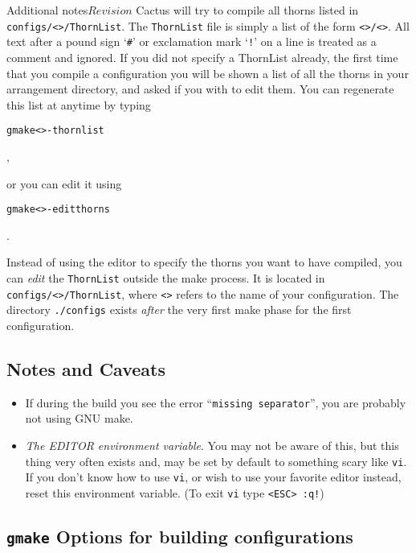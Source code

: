 \begin{cactuspart}{Additional notes}{}{$Revision$}
Cactus will try to compile all thorns listed in
\texttt{configs/<>/ThornList}.
The \texttt{ThornList} file is simply a list of the form
\texttt{<>/<>}.  All text after a pound sign
`\texttt{\#}' or exclamation mark `\texttt{!}'
on a line is treated as a comment and ignored.
If you did
not specify a ThornList already, the first time that you compile a configuration
you will be shown a list of all the thorns in your arrangement
directory, and asked if you with to edit them. You can regenerate
this list at anytime by typing

\begin{alltt}
gmake <>-thornlist
\end{alltt},

or you can edit it using

\begin{alltt}
gmake <>-editthorns
\end{alltt}.

Instead of using the editor to specify the thorns you want to
  have compiled, you can \emph{edit} the \texttt{ThornList} outside
  the make process. It is located in \texttt{configs/<>/ThornList},
  where \texttt{<>} refers to the name of your configuration.
  The directory \texttt{./configs} exists \emph{ after} the very first
  make phase for the first configuration.

\subsection{Notes and Caveats}
\begin{itemize}
\item{} If during the build you see the error ``\texttt{missing
    separator}'', you are probably not using GNU make.
\item{} \textit{The EDITOR environment variable}. You may not be aware of
  this, but this thing very often exists and, may be set  by default to
  something scary like \texttt{vi}. If you don't know how to use \texttt{vi},
  or wish to
  use your favorite editor instead, reset this environment variable.
  (To exit \texttt{vi} type \texttt{<ESC> :q!})
\end{itemize}

\subsection{\texttt{gmake} Options for building configurations}
\label{sec:gmopfobuco}


\end{cactuspart}
